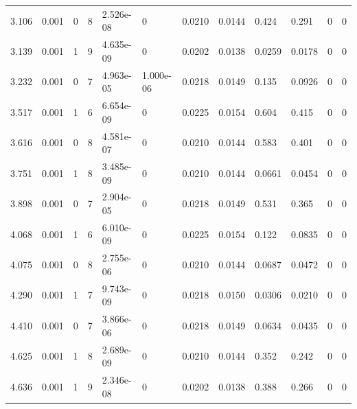 \documentclass[preview]{standalone}
\begin{document}
{{\begin{tabular}{L{1.2cm}C{1.2cm} C{0.3cm}C{0.5cm} C{1.4cm}C{1.4cm} C{1.4cm}C{1.4cm} C{1.6cm}C{1.6cm} C{1.6cm}C{1.6cm}}
  3.106  &  0.001  & 0     &  8 &  2.526e-08  & 0  &  0.0210&   0.0144& 0.424 & 0.291   &  0 & 0  \\ 
  3.139  &  0.001  & 1     &  9 &  4.635e-09  & 0  &  0.0202&   0.0138& 0.0259 & 0.0178   &  0 & 0  \\ 
  3.232  &  0.001  & 0     &  7 &  4.963e-05  & 1.000e-06  &  0.0218&   0.0149& 0.135 & 0.0926   &  0 & 0  \\ 
  3.517  &  0.001  & 1     &  6 &  6.654e-09  & 0  &  0.0225&   0.0154& 0.604 & 0.415   &  0 & 0  \\ 
  3.616  &  0.001  & 0     &  8 &  4.581e-07  & 0  &  0.0210&   0.0144& 0.583 & 0.401   &  0 & 0  \\ 
  3.751  &  0.001  & 1     &  8 &  3.485e-09  & 0  &  0.0210&   0.0144& 0.0661 & 0.0454   &  0 & 0  \\ 
  3.898  &  0.001  & 0     &  7 &  2.904e-05  & 0  &  0.0218&   0.0149& 0.531 & 0.365   &  0 & 0  \\ 
  4.068  &  0.001  & 1     &  6 &  6.010e-09  & 0  &  0.0225&   0.0154& 0.122 & 0.0835   &  0 & 0  \\ 
  4.075  &  0.001  & 0     &  8 &  2.755e-06  & 0  &  0.0210&   0.0144& 0.0687 & 0.0472   &  0 & 0  \\ 
  4.290  &  0.001  & 1     &  7 &  9.743e-09  & 0  &  0.0218&   0.0150& 0.0306 & 0.0210   &  0 & 0  \\ 
  4.410  &  0.001  & 0     &  7 &  3.866e-06  & 0  &  0.0218&   0.0149& 0.0634 & 0.0435   &  0 & 0  \\ 
  4.625  &  0.001  & 1     &  8 &  2.689e-09  & 0  &  0.0210&   0.0144& 0.352 & 0.242   &  0 & 0  \\ 
  4.636  &  0.001  & 1     &  9 &  2.346e-08  & 0  &  0.0202&   0.0138& 0.388 & 0.266   &  0 & 0  \\ 
\hline 
\end{tabular} 

}}
\end{document}
